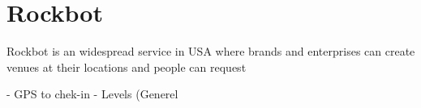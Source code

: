 \section{Rockbot}
Rockbot is an widespread service in USA where brands and enterprises can create venues at their locations and people can request

- GPS to chek-in
- Levels (Generel 